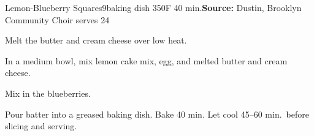 \begin{recipe}{Lemon-Blueberry Squares}{9\inch{}\inch baking dish \hfill 350\0F \hfill 40 min.}{\textbf{Source:} Dustin, Brooklyn Community Choir \hfill serves 24}

 Melt the butter and cream cheese over low heat.

 In a medium bowl, mix lemon cake mix, egg, and melted butter and cream cheese.

 Mix in the blueberries.

 \newstep Pour batter into a greased baking dish. Bake 40 min. Let cool 45--60 min.\ before slicing and serving.
\end{recipe}
